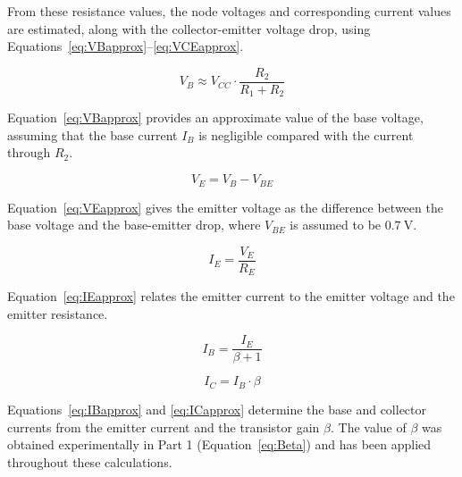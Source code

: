 \documentclass{article}
\begin{document}
From these resistance values, the node voltages and corresponding current values are estimated, along with the collector-emitter voltage drop, using Equations~\ref{eq:VBapprox}--\ref{eq:VCEapprox}.

\begin{equation}%
\label{eq:VBapprox}
    V_B \approx V_{CC} \cdot \frac{R_2}{R_1 + R_2}
\end{equation}

Equation~\ref{eq:VBapprox} provides an approximate value of the base voltage, assuming that the base current \(I_B\) is negligible compared with the current through \(R_2\).  

\begin{equation}%
\label{eq:VEapprox}
    V_E = V_B - V_{BE}
\end{equation}

Equation~\ref{eq:VEapprox} gives the emitter voltage as the difference between the base voltage and the base-emitter drop, where \(V_{BE}\) is assumed to be \(\SI{0.7}{\volt}\).  


\begin{equation}%
\label{eq:IEapprox}
    I_E = \frac{V_E}{R_E}
\end{equation}

Equation~\ref{eq:IEapprox} relates the emitter current to the emitter voltage and the emitter resistance.  


\begin{equation}%
\label{eq:IBapprox}
    I_B = \frac{I_E}{\beta + 1}
\end{equation}

\begin{equation}%
\label{eq:ICapprox}
    I_C = I_B \cdot \beta
\end{equation}

Equations~\ref{eq:IBapprox} and \ref{eq:ICapprox} determine the base and collector currents from the emitter current and the transistor gain \(\beta\).  
The value of \(\beta\) was obtained experimentally in Part 1 (Equation~\ref{eq:Beta}) and has been applied throughout these calculations.  
 
\end{document}
